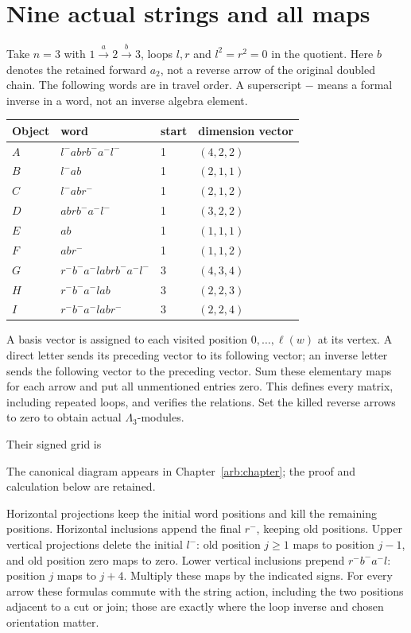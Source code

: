 \documentclass[11pt,oneside,openany]{book}
\theoremstyle{definition}\newtheorem{definition}[theorem]{Definition}
\theoremstyle{remark}\newtheorem{remark}[theorem]{Remark}
\begin{document}
\section{Nine actual strings and all maps}
Take $n=3$ with $1\xrightarrow{a}2\xrightarrow{b}3$, loops $l,r$ and $l^2=r^2=0$ in the quotient. Here $b$ denotes the retained forward $a_2$, not a reverse arrow of the original doubled chain. The following words are in travel order. A superscript $-$ means a formal inverse in a word, not an inverse algebra element.
\begin{center}\small
\begin{tabular}{llll}
\toprule
Object & word & start & dimension vector\\\midrule
$A$&$l^- a b r b^- a^- l^-$&1&$(4,2,2)$\\
$B$&$l^- a b$&1&$(2,1,1)$\\
$C$&$l^- a b r^-$&1&$(2,1,2)$\\
$D$&$a b r b^- a^- l^-$&1&$(3,2,2)$\\
$E$&$a b$&1&$(1,1,1)$\\
$F$&$a b r^-$&1&$(1,1,2)$\\
$G$&$r^- b^- a^- l a b r b^- a^- l^-$&3&$(4,3,4)$\\
$H$&$r^- b^- a^- l a b$&3&$(2,2,3)$\\
$I$&$r^- b^- a^- l a b r^-$&3&$(2,2,4)$\\\bottomrule
\end{tabular}
\end{center}
A basis vector is assigned to each visited position $0,\ldots,\ell(w)$ at its vertex. A direct letter sends its preceding vector to its following vector; an inverse letter sends the following vector to the preceding vector. Sum these elementary maps for each arrow and put all unmentioned entries zero. This defines every matrix, including repeated loops, and verifies the relations. Set the killed reverse arrows to zero to obtain actual $\Lambda_3$-modules.

Their signed grid is
\par\noindent The canonical diagram appears in Chapter~\ref{arb:chapter}; the proof and calculation below are retained.\par
Horizontal projections keep the initial word positions and kill the remaining positions. Horizontal inclusions append the final $r^-$, keeping old positions. Upper vertical projections delete the initial $l^-$: old position $j\ge1$ maps to position $j-1$, and old position zero maps to zero. Lower vertical inclusions prepend $r^-b^-a^-l$: position $j$ maps to $j+4$. Multiply these maps by the indicated signs. For every arrow these formulas commute with the string action, including the two positions adjacent to a cut or join; those are exactly where the loop inverse and chosen orientation matter.
\end{document}
